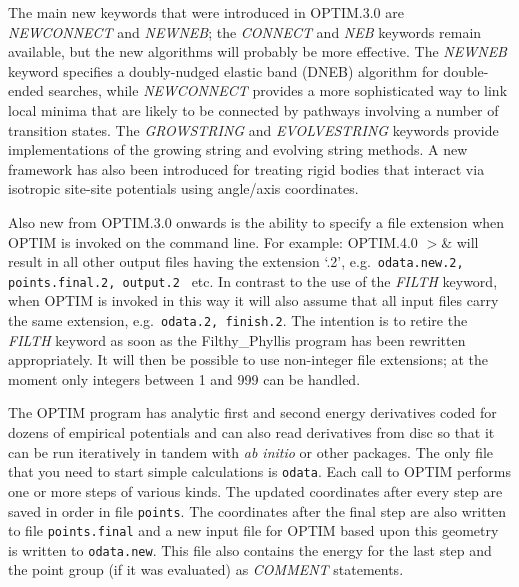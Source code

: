 \documentclass[12pt,a4paper,dvips]{article}
\begin{document}
The main new keywords that were introduced in
OPTIM.3.0 are {\it NEWCONNECT} and {\it NEWNEB};
the {\it CONNECT} and {\it NEB} keywords remain available, but the new algorithms
will probably be more effective. The {\it NEWNEB} keyword specifies a
doubly-nudged elastic band (DNEB) algorithm for double-ended searches,\cite{TrygubenkoW04}
while {\it NEWCONNECT} provides a more sophisticated way to link local minima
that are likely to be connected by pathways involving a number of transition states.
The {\it GROWSTRING} and {\it EVOLVESTRING} keywords provide implementations of the
growing string and evolving string methods.\cite{ERV02,PetersHBC04}
A new framework has also been introduced for treating rigid bodies that interact
via isotropic site-site potentials using angle/axis coordinates.\cite{Wales05}

Also new from OPTIM.3.0 onwards is the ability to specify a file extension when OPTIM is invoked on the
command line. For example:
{\obeylines
OPTIM.4.0  \qquad $>$\& 
}
\noindent will result in all other output files having the 
extension `.2', e.g.~{\tt odata.new.2, points.final.2, output.2 } etc.
In contrast to the use of the {\it FILTH} keyword, when OPTIM is invoked in this way
it will also assume that all input files carry the same extension, e.g.~{\tt odata.2, finish.2}.
The intention is to retire the {\it FILTH} keyword as soon as the Filthy\_Phyllis program
has been rewritten appropriately. It will then be possible to use non-integer file extensions;
at the moment only integers between 1 and 999 can be handled.

The OPTIM program has analytic first and second energy derivatives coded for dozens of
empirical potentials and can also read derivatives from disc so that it can be run
iteratively in tandem with {\it ab initio\/} or other packages. 
The only file that you need to start simple calculations is {\tt odata}. 
Each call to OPTIM performs one or more steps of various kinds.
The updated coordinates after every step are saved in order
in file {\tt points}. The coordinates after the final step are also written to file
{\tt points.final} and a new input file for OPTIM based upon this geometry is written
to {\tt odata.new}. This file also contains the energy for the last step and
the point group (if it was evaluated) as {\it COMMENT\/} statements.
\end{document}
